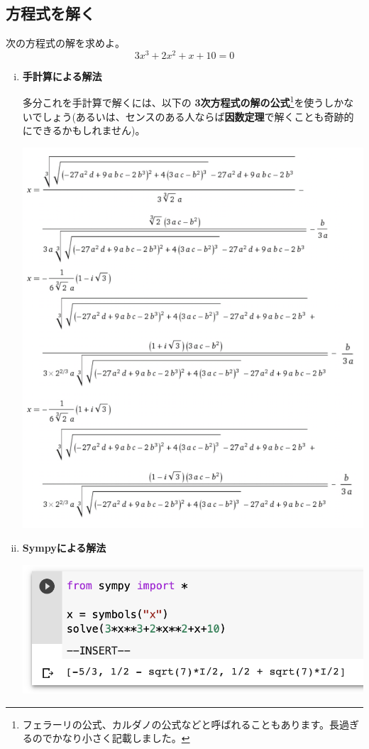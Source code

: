 \documentclass[9pt, a5paper,dvipdfmx]{jsbook}
\begin{document}
\subsection{方程式を解く}
\begin{framed}
\begin{exq}
次の方程式の解を求めよ。
\Large
$$3x^3+2x^2+x+10 = 0$$
\normalsize
\end{exq}
\end{framed}
\begin{enumerate}[(i)]
    \item 
    {\bf 手計算による解法}
    
多分これを手計算で解くには、以下の
{\bf 3次方程式の解の公式}\footnote{フェラーリの公式、カルダノの公式などと呼ばれることもあります。長過ぎるのでかなり小さく記載しました。}を使うしかないでしょう(あるいは、センスのある人ならば{\bf 因数定理}で解くことも奇跡的にできるかもしれません)。
    \begin{center}
    \includegraphics[scale=0.5]{fig1-2-4.png}
    \end{center}    

    \item
    {\bf Sympyによる解法}
    \begin{center}
    \includegraphics[scale=0.5]{fig1-2-3.png}
    \end{center}    
\end{enumerate}
\end{document}

